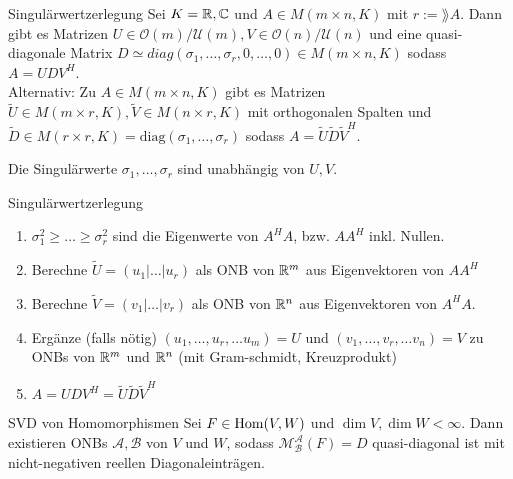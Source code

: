 \begin{nosatz}{Singulärwertzerlegung}
    Sei $K = \mathbb{R}, \mathbb{C}$ und $A \in M(m\times n,K)$ mit $r := \rang A$. Dann gibt es Matrizen $U \in \mathcal{O}(m)/ \mathcal{U}(m), V \in \mathcal{O}(n)/ \mathcal{U}(n)$ und eine quasi-diagonale Matrix $D \simeq diag(\sigma_{1}, \ldots, \sigma_{r}, 0, \ldots,0) \in M(m\times n,K)$ sodass $A = UDV^H$.\\
    Alternativ: Zu $A \in M(m\times n,K)$ gibt es Matrizen $\tilde{U} \in M(m\times r,K), \tilde{V} \in M(n\times r,K)$ mit orthogonalen Spalten und $\tilde{D} \in M(r\times r,K) = \text{diag}(\sigma_1, \ldots , \sigma_r)$ sodass $A = \tilde{U} \tilde{D} \tilde{V}^H$.
\end{nosatz}
Die Singulärwerte $\sigma_{1}, \ldots, \sigma_{r}$ sind unabhängig von $U,V$.


\begin{rezept}{Singulärwertzerlegung}
    \begin{enumerate}[{(}i{)}]
        \item   $\sigma_1^2 \geq \ldots \geq \sigma_r^2$ sind die Eigenwerte von $A^HA$, bzw. $AA^H$ inkl. Nullen.
        \item   Berechne $\tilde{U} = (u_1| \ldots | u_r)$ als ONB von $\mathbb{R}^m$ aus Eigenvektoren von $AA^H$
        \item   Berechne $\tilde{V} = (v_1| \ldots | v_r)$ als ONB von $\mathbb{R}^n$ aus Eigenvektoren von $A^HA$.
        \item   Ergänze (falls nötig) $(u_{1}, \ldots, u_{r}, \ldots u_m) = U$ und $(v_{1}, \ldots, v_{r}, \ldots v_n) = V$ zu ONBs von $\mathbb{R}^m$ und $\mathbb{R}^n$ (mit Gram-schmidt, Kreuzprodukt)
        \item   $A = U D V^H = \tilde{U} \tilde{D} \tilde{V}^H$ 
    \end{enumerate}
\end{rezept}

\begin{nosatz}{SVD von Homomorphismen}
    Sei $F \in \operatorname{Hom}(V,W)$ und $\dim V, \dim W < \infty$. Dann existieren ONBs $\mathcal{A}, \mathcal{B}$ von $V$ und $W$, sodass $\mathcal{M}_{\mathcal{B}}^{\mathcal{A}}(F) = D$ quasi-diagonal ist mit nicht-negativen reellen Diagonaleinträgen.
\end{nosatz}

